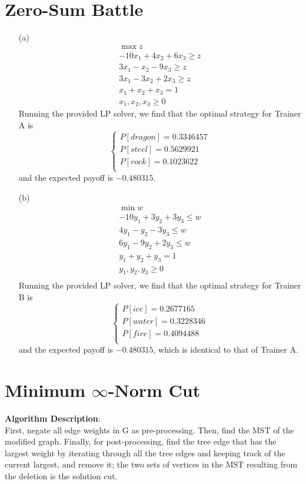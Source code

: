 \documentclass[11pt]{article}
\theoremstyle{definition}
\theoremstyle{remark}
\begin{document}
\section{Zero-Sum Battle}
\begin{enumerate}
\item[(a)]
\begin{align*}
\max z \\
-10x_1 + 4x_2 + 6x_3 \geq z\\
3x_1-x_2-9x_3 \geq z\\
3x_1-3x_2+2x_3 \geq z\\
x_1 + x_2 + x_3 = 1 \\
x_1,x_2,x_3 \geq 0
\end{align*}
Running the provided LP solver, we find that the optimal strategy for Trainer A is
\[
\begin{cases}
P[dragon] = 0.3346457\\
P[steel] = 0.5629921\\
P[rock] = 0.1023622\\
\end{cases}
\]
and the expected payoff is $-0.480315$.
\item[(b)]
\begin{align*}
\min w \\
-10y_1 + 3y_2 + 3y_3 \leq w \\
4y_1 - y_2 - 3y_3 \leq w \\
6y_1 - 9y_2 + 2y_3 \leq w \\
y_1+y_2+y_3 = 1 \\
y_1,y_2,y_3 \geq 0 \\
\end{align*}
Running the provided LP solver, we find that the optimal strategy for Trainer B is
\[
\begin{cases}
P[ice] = 0.2677165\\
P[water] = 0.3228346\\
P[fire] = 0.4094488\\
\end{cases}
\]
and the expected payoff is $-0.480315$, which is identical to that of Trainer A.
\end{enumerate}
\clearpage

\section{Minimum $\infty$-Norm Cut}
\textbf{Algorithm Description}:\\
First, negate all edge weights in G as pre-processing. Then, find the MST of the modified graph. Finally, for post-processing, find the tree edge that has the largest weight by iterating through all the tree edges and keeping track of the current largest, and remove it; the two sets of vertices in the MST resulting from the deletion is the solution cut.\bigskip
\end{document}
